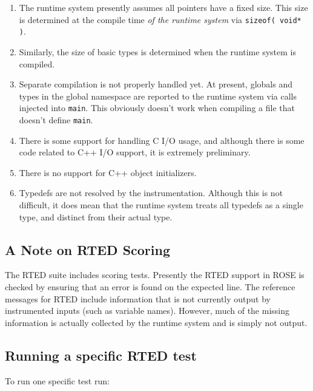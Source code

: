 \begin{enumerate}
    
    \item The runtime system presently assumes all pointers have a fixed size.
    This size is determined at the compile time \emph{of the runtime system} via
    \texttt{sizeof( void* )}.

    \item Similarly, the size of basic types is determined when the runtime
    system is compiled.

    \item Separate compilation is not properly handled yet.  At present, globals
    and types in the global namespace are reported to the runtime system via
    calls injected into \texttt{main}.  This obviously doesn't work when compiling a file
    that doesn't define \texttt{main}.

    \item There is some support for handling C I/O usage, and although there is
    some code related to C++ I/O support, it is extremely preliminary.

    \item There is no support for C++ object initializers.

    \item Typedefs are not resolved by the instrumentation.  Although this is
    not difficult, it does mean that the runtime system treats all typedefs as a
    single type, and distinct from their actual type.

\end{enumerate}

\subsection{A Note on RTED Scoring}

The RTED suite includes scoring tests.  Presently the RTED support in ROSE is
checked by ensuring that an error is found on the expected line.  The reference
messages for RTED include information that is not currently output by
instrumented inputs (such as variable names).  However, much of the missing
information is actually collected by the runtime system and is simply not
output.


\subsection{Running a specific RTED test}

 
To run one specific test run:

